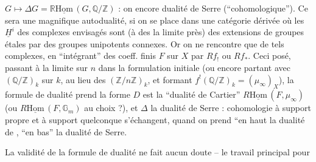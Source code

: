 $G\longmapsto\Delta G=\mathbb{R}\underline{\mathrm{Hom}}\,(G,\mathbb{Q}/\mathbb{Z})$ : on  encore dualité de Serre (``cohomologique''). Ce sera une magnifique autodualité, si on se place dans une catégorie dérivée où les $\underline{H}^{i}$ des complexes envisagés sont (à des   la limite près) des extensions de groupes étales par des groupes unipotents connexes. Or on ne rencontre que de tels complexes, en ``intégrant'' des coeff. finis $F$ sur $X$ par $Rf_!$ ou $Rf_*$. Ceci posé, passant à la limite sur $n$ dans la formulation initiale (ou encore partant avec $(\mathbb{Q}/\mathbb{Z})_k$ sur $k$, au lieu des $(\mathbb{Z}/n\mathbb{Z})_k$, et formant $f^!(\mathbb{Q}/\mathbb{Z})_k=(\mu_\infty)_X$), la formule de dualité prend la forme
 $D$ est la ``dualité de Cartier'' $R\underline{\mathrm{Hom}}\,(F,\mu_\infty)$ (ou $R\underline{\mathrm{Hom}}\,(F,\mathbb{G}_m)$ au choix ?), et $\Delta$ la dualité de Serre : cohomologie à support propre et à support quelconque s'échangent, quand on prend ``en haut la dualité de , ``en bas'' la dualité de Serre.

La validité de la formule de dualité ne fait aucun doute -- le travail principal pour
